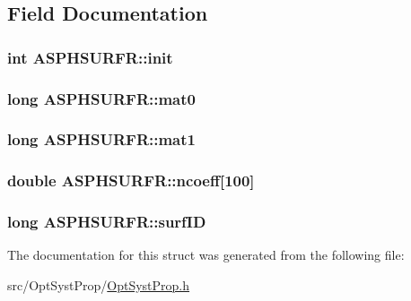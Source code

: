 \subsection{Field Documentation}
\hypertarget{structASPHSURFR_ae2386c06994cf2b5a8090bbdee2a7957}{
\subsubsection[{init}]{\setlength{\rightskip}{0pt plus 5cm}int A\+S\+P\+H\+S\+U\+R\+F\+R\+::init}}\label{structASPHSURFR_ae2386c06994cf2b5a8090bbdee2a7957}
\hypertarget{structASPHSURFR_a9c6a2f637f66b2911129ec69640f98d2}{
\subsubsection[{mat0}]{\setlength{\rightskip}{0pt plus 5cm}long A\+S\+P\+H\+S\+U\+R\+F\+R\+::mat0}}\label{structASPHSURFR_a9c6a2f637f66b2911129ec69640f98d2}
\hypertarget{structASPHSURFR_a0f31e31171389f94d70cc4ea0610e2a4}{
\subsubsection[{mat1}]{\setlength{\rightskip}{0pt plus 5cm}long A\+S\+P\+H\+S\+U\+R\+F\+R\+::mat1}}\label{structASPHSURFR_a0f31e31171389f94d70cc4ea0610e2a4}
\hypertarget{structASPHSURFR_a06a64705ac7cbc0d7e54467d9b91c039}{
\subsubsection[{ncoeff}]{\setlength{\rightskip}{0pt plus 5cm}double A\+S\+P\+H\+S\+U\+R\+F\+R\+::ncoeff\mbox{[}100\mbox{]}}}\label{structASPHSURFR_a06a64705ac7cbc0d7e54467d9b91c039}
\hypertarget{structASPHSURFR_a1883e1812b5e228da6efc3fa85b88ff5}{
\subsubsection[{surf\+I\+D}]{\setlength{\rightskip}{0pt plus 5cm}long A\+S\+P\+H\+S\+U\+R\+F\+R\+::surf\+I\+D}}\label{structASPHSURFR_a1883e1812b5e228da6efc3fa85b88ff5}


The documentation for this struct was generated from the following file\+:\begin{DoxyCompactItemize}
\item 
src/\+Opt\+Syst\+Prop/\hyperlink{OptSystProp_8h}{Opt\+Syst\+Prop.\+h}\end{DoxyCompactItemize}

